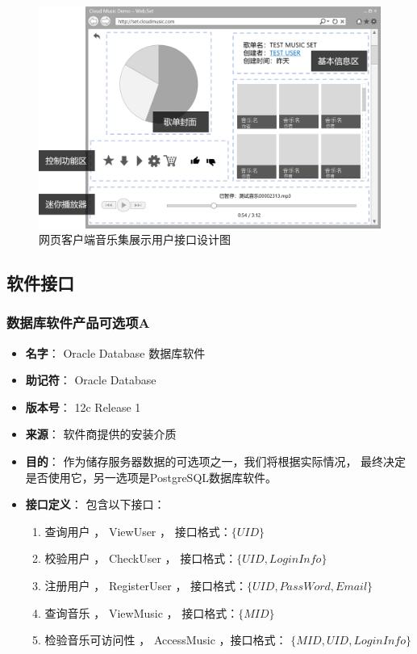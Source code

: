 \begin{figure}[h!]
  \centering

  \includegraphics[width=.95\linewidth]{figures/web_collection}

  \caption{  \label{fig:web_collection}
  		网页客户端音乐集展示用户接口设计图
    }
\end{figure}

\subsection{软件接口}

\subsubsection{数据库软件产品可选项A} %
\begin{itemize}
	\item \textbf{名字}：
		Oracle Database 数据库软件
	\item \textbf{助记符}：
		Oracle Database
	\item \textbf{版本号}：
		12c Release 1
	\item \textbf{来源}：
		软件商提供的安装介质
	\item \textbf{目的}：
		作为储存服务器数据的可选项之一，我们将根据实际情况，
			最终决定是否使用它，另一选项是PostgreSQL数据库软件。
	\item \textbf{接口定义}：
		包含以下接口：
		\begin{enumerate}
			\item 查询用户 ， ViewUser   ， 接口格式：$\{ UID \}$
			\item 校验用户 ， CheckUser  ， 接口格式：$\{ UID, LoginInfo \}$
			\item 注册用户 ， RegisterUser  ， 接口格式：$\{ UID,  PassWord, Email\}$
			\item 查询音乐 ， ViewMusic  ， 接口格式：$\{ MID \}$
			\item 检验音乐可访问性 ， AccessMusic ，接口格式： $\{ MID, UID, LoginInfo \}$ 
		\end{enumerate}
\end{itemize}

